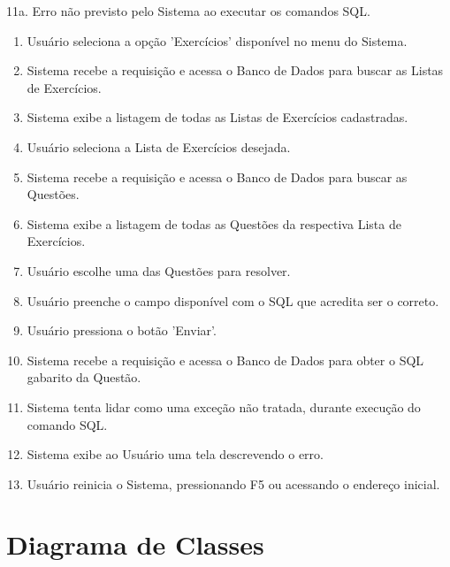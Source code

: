 \documentclass[graduacao,brazil]{ThesisPUC}
\begin{document}
11a. Erro n\~{a}o previsto pelo Sistema ao executar os comandos SQL.

\begin{enumerate}
  \item Usu\'{a}rio seleciona a opção 'Exerc\'{i}cios' dispon\'{i}vel no menu do Sistema.
  \item Sistema recebe a requisi\c{c}\~{a}o e acessa o Banco de Dados para buscar as Listas de Exerc\'{i}cios.
  \item Sistema exibe a listagem de todas as Listas de Exerc\'{i}cios cadastradas.
  \item Usu\'{a}rio seleciona a Lista de Exerc\'{i}cios desejada.
  \item Sistema recebe a requisi\c{c}\~{a}o e acessa o Banco de Dados para buscar as Quest\~{o}es.
  \item Sistema exibe a listagem de todas as Quest\~{o}es da respectiva Lista de Exerc\'{i}cios.
  \item Usu\'{a}rio escolhe uma das Quest\~{o}es para resolver.
  \item Usu\'{a}rio preenche o campo dispon\'{i}vel com o SQL que acredita ser o correto.
  \item Usu\'{a}rio pressiona o bot\~{a}o 'Enviar'.
  \item Sistema recebe a requisi\c{c}\~{a}o e acessa o Banco de Dados para obter o SQL gabarito da Quest\~{a}o.
  \item Sistema tenta lidar como uma exce\c{c}\~{a}o n\~{a}o tratada, durante execu\c{c}\~{a}o do comando SQL.
  \item Sistema exibe ao Usu\'{a}rio uma tela descrevendo o erro.
  \item Usu\'{a}rio reinicia o Sistema, pressionando F5 ou acessando o endere\c{c}o inicial.
\end{enumerate}


\section{Diagrama de Classes}

\end{document}
